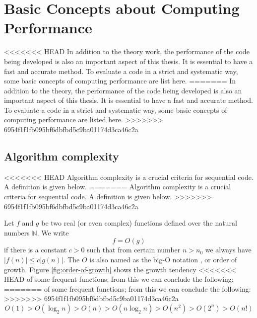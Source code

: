 
\chapter{Basic Concepts about Computing Performance\label{chpt:computing-performance}}

<<<<<<< HEAD
In addition to the theory work, the performance of the code being
developed is also an important aspect of this thesis. It is essential
to have a fast and accurate method. To evaluate a code in a strict
and systematic way, some basic concepts of computing performance are
list here. 
=======
In addition to the theory, the performance of the code being developed is
also an important aspect of this thesis. It is essential to
have a fast and accurate method. To evaluate a code in a strict and
systematic way, some basic concepts of computing performance are listed
here. 
>>>>>>> 6954f1f1fb095bf6dbfbd5c9ba01174d3ca46c2a


\section{Algorithm complexity}

<<<<<<< HEAD
Algorithm complexity is a crucial criteria for sequential code. A
definition is given below.
=======
Algorithm complexity is a crucial criteria for sequential code.
A definition is given below.
>>>>>>> 6954f1f1fb095bf6dbfbd5c9ba01174d3ca46c2a

Let $f$ and $g$ be two real (or even complex) functions defined
over the natural numbers $\mathbb{N}$. We write
\begin{equation}
f=O(g)
\end{equation}
if there is a constant $c>0$ such that from certain number $n>n_{0}$
we always have $\left|f(n)\right|\leq c\left|g(n)\right|.$ The $O$
is also named as the big-O notation \citep{Complexity}, or order
of growth. Figure \ref{fig:order-of-growth} shows the growth tendency
<<<<<<< HEAD
of some frequent functions; from this we can conclude the following:
=======
of some frequent functions; from this we can conclude the following: 
>>>>>>> 6954f1f1fb095bf6dbfbd5c9ba01174d3ca46c2a
\begin{equation}
O(1)>O(\log_{2}n)>O(n)>O(n\log_{2}n)>O(n^{2})>O(2^{n})>O(n!)
\end{equation}


